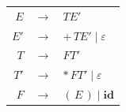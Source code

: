\begin{center}
\renewcommand{\arraystretch}{1.25}
\begin{tabular}{@{}r@{\;}c@{\;}l@{}}
$E$ & $\to$ & $T E'$\\
$E'$ & $\to$ & $+\,T E' \mid \varepsilon$\\
$T$ & $\to$ & $F T'$\\
$T'$ & $\to$ & $*\,F T' \mid \varepsilon$\\
$F$ & $\to$ & $(\,E\,) \mid \mathbf{id}$\\
\end{tabular}
\end{center}
